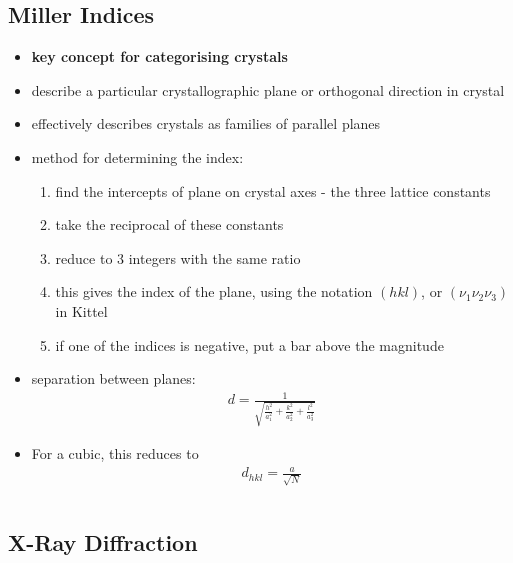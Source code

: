 \documentclass[a4paper,11pt,normalem]{article}
\begin{document}
\subsection{Miller Indices}

\begin{itemize}
    \item \textbf{key concept for categorising crystals}
    \item describe a particular crystallographic plane or orthogonal direction in crystal
    \item effectively describes crystals as families of parallel planes
    \item method for determining the index:
        \begin{enumerate}
            \item find the intercepts of plane on crystal axes - the three lattice constants
            \item take the reciprocal of these constants
            \item reduce to 3 integers with the same ratio
            \item this gives the index of the plane, using the notation \((hkl)\), or \((\nu_1 \nu_2 \nu_3)\) in Kittel
            \item if one of the indices is negative, put a bar above the magnitude
        \end{enumerate}
    \item separation between planes:
        \begin{align*}
            d = \frac{1}{\sqrt{\frac{h^2}{a_1^2} + \frac{k^2}{a_2^2} + \frac{l^2}{a_3^2}}}
        \end{align*}
    \item For a cubic, this reduces to
        \begin{align*}
            d_{hkl} = \frac{a}{\sqrt{N}}
        \end{align*}
\end{itemize}

\section{}
\subsection{X-Ray Diffraction}
\end{document}

